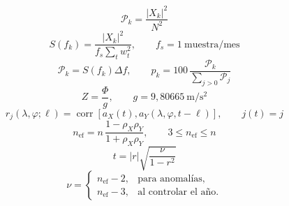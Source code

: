 \documentclass[10pt]{article}
\begin{document}
\newpage
\begin{equation}
\mathcal{P}_k=\frac{|X_k|^2}{N^2}\tag{4.3}
\end{equation}
\newpage
\begin{equation}
S(f_k)=\frac{|X_k|^2}{f_s\sum_t w_t^2},\qquad f_s=1\ \mathrm{muestra/mes}\tag{4.4}
\end{equation}
\newpage
\begin{equation}
\mathcal{P}_k=S(f_k)\Delta f,\qquad p_k=100\,\frac{\mathcal{P}_k}{\sum_{j>0}\mathcal{P}_j}\tag{4.5}
\end{equation}
\newpage
\begin{equation}
Z=\frac{\Phi}{g},\qquad g=9{,}80665\ \mathrm{m/s^2}\tag{5.1}
\end{equation}
\newpage
\begin{equation}
r_j(\lambda,\varphi;\ell)=\operatorname{corr}\!\left[a_X(t),a_Y(\lambda,\varphi,t-\ell)\right],\qquad j(t)=j\tag{5.2}
\end{equation}
\newpage
\begin{equation}
n_{\mathrm{ef}}=n\,\frac{1-\rho_X\rho_Y}{1+\rho_X\rho_Y},\qquad 3\leq n_{\mathrm{ef}}\leq n\tag{5.3}
\end{equation}
\newpage
\begin{equation}
t=|r|\sqrt{\frac{\nu}{1-r^2}}\tag{5.4}
\end{equation}
\newpage
\begin{equation}
\nu=\begin{cases}n_{\mathrm{ef}}-2,&\text{para anomalías},\\n_{\mathrm{ef}}-3,&\text{al controlar el año}.\end{cases}\tag{5.5}
\end{equation}
\end{document}
